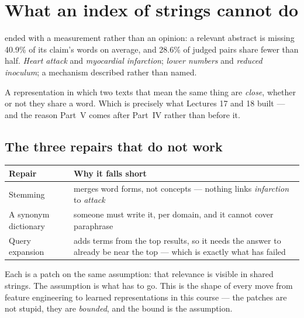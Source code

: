 \documentclass[11pt,a4paper]{article}
\begin{document}

\section{What an index of strings cannot do}

 ended with a measurement rather than an opinion: a relevant
abstract is missing 40.9\% of its claim's words on average, and 28.6\% of
judged pairs share fewer than half. \emph{Heart attack} and \emph{myocardial
infarction}; \emph{lower numbers} and \emph{reduced inoculum}; a mechanism
described rather than named.

\begin{keybox}[title={The requirement}]
A representation in which two texts that mean the same thing are \emph{close},
whether or not they share a word. Which is precisely what Lectures 17 and 18
built --- and the reason Part~V comes after Part~IV rather than before it.
\end{keybox}

\subsection{The three repairs that do not work}

\begin{center}
\small
\begin{tabular}{p{}p{}}
\toprule
\textbf{Repair} & \textbf{Why it falls short} \\
\midrule
Stemming & merges word forms, not concepts --- nothing links
\emph{infarction} to \emph{attack} \\
A synonym dictionary & someone must write it, per domain, and it cannot cover
paraphrase \\
Query expansion & adds terms from the top results, so it needs the answer to
already be near the top --- which is exactly what has failed \\
\bottomrule
\end{tabular}
\end{center}

Each is a patch on the same assumption: that relevance is visible in shared
strings. The assumption is what has to go. This is the shape of every move from
feature engineering to learned representations in this course --- the patches
are not stupid, they are \emph{bounded}, and the bound is the assumption.
\end{document}
